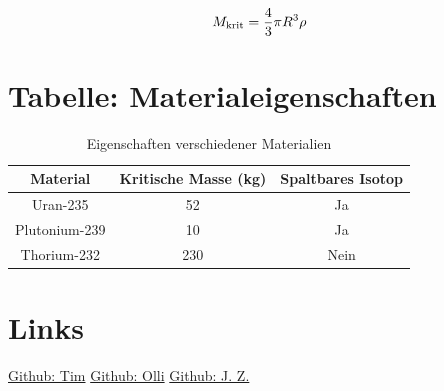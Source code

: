 \documentclass[a4paper,12pt]{article}
\begin{document}
\begin{equation}
    \fontsize{20}{10}
    M_\text{krit} = \frac{4}{3} \pi R^3 \rho
    \label{eq:kritische_masse}
\end{equation}

\newpage
\clearpage

\section{Tabelle: Materialeigenschaften}
\begin{table}[h]
    \centering
    \begin{tabular}{|c|c|c|}
    \hline
    Material & Kritische Masse (kg) & Spaltbares Isotop \\
    \hline
    Uran-235 & 52 & Ja \\
    Plutonium-239 & 10 & Ja \\
    Thorium-232 & 230 & Nein \\
    \hline
    \end{tabular}
    \caption{Eigenschaften verschiedener Materialien}
\end{table}

\newpage

\section{Links}
\begin{center}
\end{center}
\bigskip

\href{https://github.com/Tim-foe}{Github: Tim} \hspace{4cm}
\href{https://github.com/YoOlli}{Github: Olli} \hspace{4cm}
\href{https://github.com/Jason4225}{Github: J. Z.}

%
%
\end{document}
